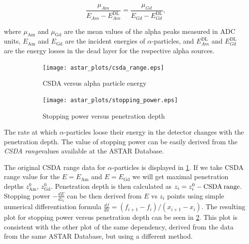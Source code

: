 \documentclass[a4paper,12pt]{article}
\begin{document}
\begin{equation}
\frac{\mu_{Am}}{E_{Am} - E^\text{DL}_{Am}} = \frac{\mu_{Gd}}{E_{Gd} - E^\text{DL}_{Gd}},
\label{eq:gain_equality}
\end{equation}

\noindent where $\mu_\text{Am}$ and $\mu_\text{Gd}$ are the mean values of the
alpha peaks measured in ADC units, $E_\text{Am}$ and $E_\text{Gd}$ are the
incident energies of $\alpha$-particles, and $E^\text{DL}_{Am}$ and
$E^\text{DL}_{Gd}$ are the energy losses in the dead layer for the respective
alpha sources.

\begin{figure}
\begin{subfigure}[b]{0.5\textwidth}
\texttt{[image: astar\_plots/csda\_range.eps]}
\caption{CSDA versus alpha particle energy}\label{subfig:csda_range}
\end{subfigure}
\begin{subfigure}[b]{0.5\textwidth}
\texttt{[image: astar\_plots/stopping\_power.eps]}
\caption{Stopping power versus penetration depth}\label{subfig:stopping_power}
\end{subfigure}
\caption{}\label{fig:astar_plots}
\end{figure}

The rate at which $\alpha$-particles loose their energy in the detector changes
with the penetration depth. The value of stopping power can be easily derived
from the \emph{CSDA range}\footnotemark values available at the
ASTAR Database\cite{astar_database}.


The original CSDA range data for $\alpha$-particles is displayed in
\cref{subfig:csda_range}. If we take CSDA range value for the
$E=E_{\text{Am}}$ and $E=E_{\text{Gd}}$ we will get maximal penetration depths
$z^0_{\text{Am}}$, $z^0_{\text{Gd}}$.  Penetration depth is then calculated as
$z_i = z^0_i - \text{CSDA\:range}$.  Stopping power $-\frac{dE}{dz_i}$ can be
then derived from $E$ vs $z_i$ points using simple numerical differentiation formula
$\frac{df}{dx} = (f_{i+1} - f_i)/(x_{i+1} - x_i)$. The resulting plot for
stopping power versus penetration depth can be seen in \cref{subfig:stopping_power}.
This plot is consistent with the other plot\cite{schmidke_edep} of the same dependency, derived from
the data from the same ASTAR Database, but using a different method.
\end{document}
